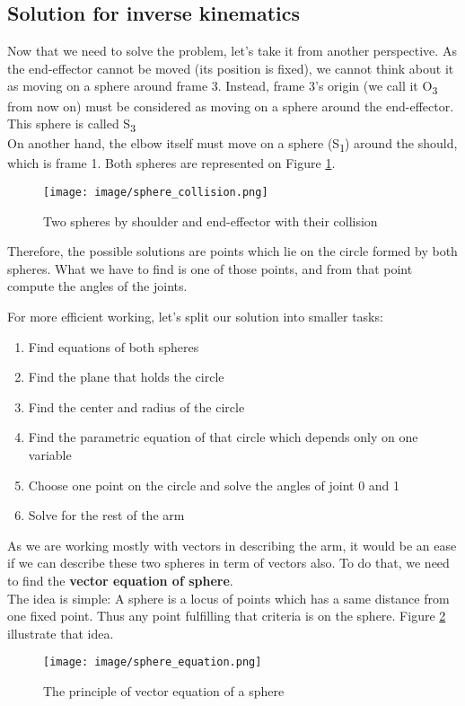 \documentclass[conference]{IEEEtran}
\def\SB#1{\textsubscript{\textcolor{black}{#1}}}
\begin{document}
  \subsection{Solution for inverse kinematics}
  Now that we need to solve the problem, let's take it from another perspective. As the end-effector cannot be moved (its position is fixed), we cannot think about it as moving on a sphere around frame 3. Instead, frame 3's origin (we call it O\SB{3} from now on) must be considered as moving on a sphere around the end-effector. This sphere is called S\SB{3}\\
  On another hand, the elbow itself must move on a sphere (S\SB{1}) around the should, which is frame 1. Both spheres are represented on Figure \ref{fig:sphere_collision}.\\
  \begin{figure}[H]
  	\centering
  	\texttt{[image: image/sphere\_collision.png]}
  	\caption{Two spheres by shoulder and end-effector with their collision}
  	\label{fig:sphere_collision}
  \end{figure}
  Therefore, the possible solutions are points which lie on the circle formed by both spheres. What we have to find is one of those points, and from that point compute the angles of the joints.
  
  For more efficient working, let's split our solution into smaller tasks:
  \begin{enumerate}
  	\item Find equations of both spheres
  	\item Find the plane that holds the circle
  	\item Find the center and radius of the circle
  	\item Find the parametric equation of that circle which depends only on one variable
  	\item Choose one point on the circle and solve the angles of joint 0 and 1
  	\item Solve for the rest of the arm
  \end{enumerate}
  As we are working mostly with vectors in describing the arm, it would be an ease if we can describe these two spheres in term of vectors also. To do that, we need to find the \textbf{vector equation of sphere}.\\
  The idea is simple: A sphere is a locus of points which has a same distance from one fixed point. Thus any point fulfilling that criteria is on the sphere. Figure \ref{fig:sphere_equation} illustrate that idea.
  \begin{figure}[H]
  	\centering
  	\texttt{[image: image/sphere\_equation.png]}
  	\caption{The principle of vector equation of a sphere}
  	\label{fig:sphere_equation}
  \end{figure}
  
\end{document}
